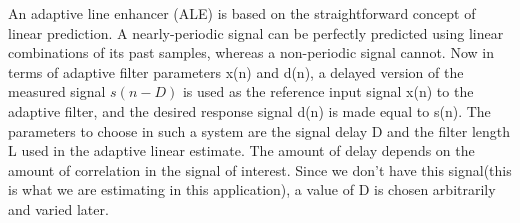 An adaptive line enhancer (ALE) is based on the straightforward concept of linear prediction. A nearly-periodic signal can be perfectly predicted using linear combinations of its past samples, whereas a non-periodic signal cannot. Now in terms of adaptive filter parameters x(n) and d(n), a delayed version of the measured signal $s(n-D)$ is used as the reference input signal x(n) to the adaptive filter, and the desired response signal d(n) is made equal to s(n). The parameters to choose in such a system are the signal delay D and the filter length L used in the adaptive linear estimate. The amount of delay depends on the amount of correlation in the signal of interest. Since we don't have this signal(this is what we are estimating in this application), a value of D is chosen arbitrarily and varied later.






